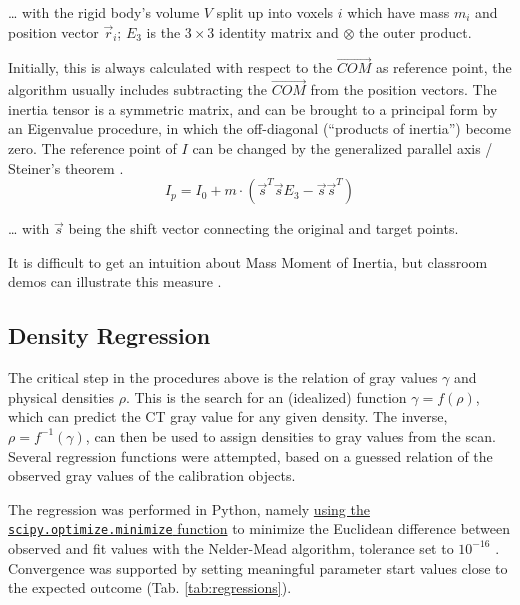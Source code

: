 \ldots{} with the rigid body's volume \(V\) split up into voxels \(i\) which have mass \(m_i\) and position vector \(\vec{r}_{i}\); \(E_{3}\) is the \(3\times 3\) identity matrix and \(\otimes\) the outer product.

Initially, this is always calculated with respect to the \(\vec{COM}\) as reference point, the algorithm usually includes subtracting the \(\vec{COM}\) from the position vectors.
The inertia tensor is a symmetric matrix, and can be brought to a principal form by an Eigenvalue procedure, in which the off-diagonal (``products of inertia'') become zero.
The reference point of \(I\) can be changed by the generalized parallel axis / Steiner's theorem \citep[][p. 245]{Lynch2017}.
\begin{equation}\label{eqn:steiner}
 I_{p} = I_{0} + m \cdot \left( \vec{s}^{T} \vec{s} E_{3} - \vec{s} \vec{s}^{T} \right)
\end{equation}

\ldots{} with \(\vec{s}\) being the shift vector connecting the original and target points.


It is difficult to get an intuition about Mass Moment of Inertia, but classroom demos can illustrate  this measure  \citep{Lewin801L19,LewinMOI,Lewin801L24}.
\subsection{Density Regression}
\label{sec:orgcb4ad09}
The critical step in the procedures above is the relation of gray values \(\gamma\) and physical densities \(\rho\).
This is the search for an (idealized) function \(\gamma = f(\rho )\), which can predict the CT gray value for any given density.
The inverse, \(\rho = f^{-1}(\gamma )\), can then be used to assign densities to gray values from the scan.
Several regression functions were attempted, based on a guessed relation of the observed gray values of the calibration objects.

The regression was performed in Python, namely \href{https://docs.scipy.org/doc/scipy/reference/generated/scipy.optimize.minimize.html}{using the \texttt{scipy.optimize.minimize} function} to minimize the Euclidean difference between observed and fit values with the Nelder-Mead algorithm, tolerance set to \(10^{-16}\) \citep{Gao2012}.
Convergence was supported by setting meaningful parameter start values close to the expected outcome (Tab. \ref{tab:regressions}).

